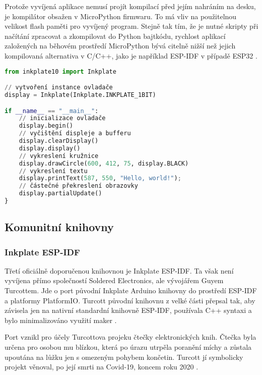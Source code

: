 Protože vyvíjená aplikace nemusí projít kompilací před jejím nahráním na desku, je kompilátor obsažen v MicroPython firmwaru. To má vliv na použitelnou velikost flash paměti pro vyvíjený program. Stejně tak tím, že je nutné skripty při načítání zpracovat a zkompilovat do Python bajtkódu, rychlost aplikací založených na běhovém prostředí MicroPython bývá citelně nižší než jejich kompilovaná alternativa v C/C++, jako je například ESP-IDF v případě ESP32 \cite{plauskaPerformanceEvaluationMicroPython2022}.

\begin{lstlisting}[label=src:micropython-hello-world,language=Python,caption={Ukázka programu pro vykreslení kružnice a Hello World řetězce pomocí MicroPython knihovny}]
from inkplate10 import Inkplate

// vytvoření instance ovladače
display = Inkplate(Inkplate.INKPLATE_1BIT)

if __name__ == "__main__":
    // inicializace ovladače
    display.begin()
    // vyčištění displeje a bufferu
    display.clearDisplay()
    display.display()
    // vykreslení kružnice
    display.drawCircle(600, 412, 75, display.BLACK)
    // vykreslení textu
    display.printText(587, 550, "Hello, world!");
    // částečné překreslení obrazovky
    display.partialUpdate()
}
\end{lstlisting}

\subsection{Komunitní knihovny}
\subsubsection{Inkplate ESP-IDF}

Třetí oficiálně doporučenou knihovnou je Inkplate ESP-IDF. Ta však není vyvíjena přímo společností Soldered Electronics, ale vývojářem Guyem Turcottem. Jde o port původní Inkplate Arduino knihovny do prostředí ESP-IDF a platformy PlatformIO. Turcott původní knihovnu z velké části přepsal tak, aby závisela jen na nativní standardní knihovně ESP-IDF, používala C++ syntaxi a bylo minimalizováno využití maker \cite{ESPIDFInkPlateREADMEMd}.

Port vznikl pro účely Turcottova projeku čtečky elektronických knih. Čtečka byla určena pro osobou mu blízkou, která po úrazu utrpěla poranění míchy a zůstala upoutána na lůžku jen s omezeným pohybem končetin. Turcott jí symbolicky projekt věnoval, po její smrti na Covid-19, koncem roku 2020 \cite{turcotteTurgu1EPubInkPlate2024}.

